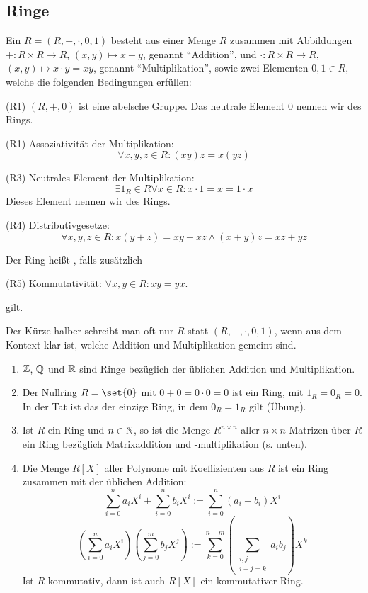 
\subsection{Ringe}\label{ringe}
\begin{definition}
    Ein  $R=(R,+,\cdot,0,1)$ besteht aus einer Menge $R$ zusammen mit Abbildungen ${+} : R \times R \to R$, $(x,y) \mapsto x+y$, genannt \enquote{Addition}, und $\cdot : R\times R \to R$, $(x,y) \mapsto x\cdot y = xy$, genannt \enquote{Multiplikation}, sowie zwei Elementen $0,1\in R$, welche die folgenden Bedingungen erfüllen:
    \begin{description}
        \item{(R1)} $(R,+,0)$ ist eine abelsche Gruppe. Das neutrale Element $0$ nennen wir  des Rings.
        \item{(R1)} Assoziativität der Multiplikation:
        \[\forall x,y,z\in R: (xy)z = x(yz)\]
        \item{(R3)} Neutrales Element der Multiplikation:
        \[\exists 1_R\in R \forall x\in R: x\cdot 1=x=1\cdot x\]
        Dieses Element nennen wir  des Rings.
        \item{(R4)} Distributivgesetze:
        \[\forall x,y,z\in R: x(y+z)=xy+xz \wedge (x+y)z=xz+yz\]
    \end{description}
    Der Ring heißt , falls zusätzlich
    \begin{description}
        \item{(R5)} Kommutativität: $\forall x,y\in R: xy=yx$.
    \end{description}
    gilt.

    Der Kürze halber schreibt man oft nur $R$ statt $(R,+,\cdot,0,1)$, wenn aus dem Kontext klar ist, welche Addition und Multiplikation gemeint sind.
\end{definition}

\begin{example}
    \begin{enumerate}
        \item $\mathbb{Z}$, $\mathbb{Q}$ und $\mathbb{R}$ sind Ringe bezüglich der üblichen Addition und
        Multiplikation.
        \item Der Nullring $R=\set{0}$ mit $0+0=0\cdot0=0$ ist ein Ring, mit $1_R=0_R=0$. In der Tat ist das der einzige Ring, in dem $0_R=1_R$ gilt (Übung).
        \item Ist $R$ ein Ring und $n\in\mathbb{N}$, so ist die Menge $R^{n\times n}$ aller $n\times n$-Matrizen über $R$ ein Ring bezüglich Matrixaddition und -multiplikation (s. unten).
        \item Die Menge $R[X]$ aller Polynome mit Koeffizienten aus $R$ ist ein
        Ring zusammen mit der üblichen Addition:
        \[\sum_{i=0}^n a_i X^i + \sum_{i=0}^n b_i X^i := \sum_{i=0}^{n} (a_i+b_i)X^i\]
        \[(\sum_{i=0}^n a_i X^i)(\sum_{j=0}^m b_j X^j) := \sum_{k=0}^{n+m} (\sum_{\substack{i,j \\ i+j=k}} a_i b_j) X^k\]
        Ist $R$ kommutativ, dann ist auch $R[X]$ ein kommutativer Ring.
    \end{enumerate}
\end{example}

